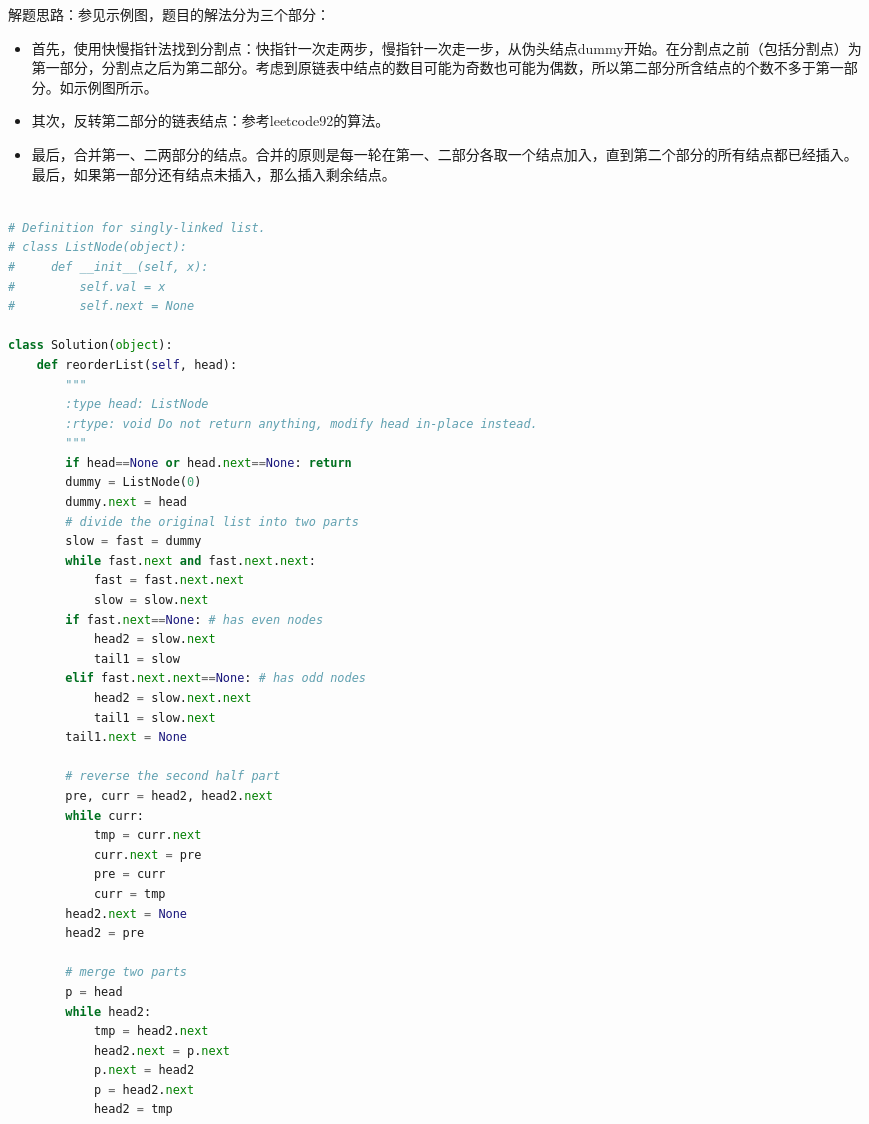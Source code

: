 \documentclass[a4paper,10pt]{article}
\begin{document}
\begin{CJK*}{UTF8}{gbsn}
\noindent 解题思路：参见示例图，题目的解法分为三个部分：
\begin{itemize}
    \item 首先，使用快慢指针法找到分割点：快指针一次走两步，慢指针一次走一步，从伪头结点dummy开始。在分割点之前（包括分割点）为第一部分，分割点之后为第二部分。考虑到原链表中结点的数目可能为奇数也可能为偶数，所以第二部分所含结点的个数不多于第一部分。如示例图所示。
    \item 其次，反转第二部分的链表结点：参考leetcode92的算法。
    \item 最后，合并第一、二两部分的结点。合并的原则是每一轮在第一、二部分各取一个结点加入，直到第二个部分的所有结点都已经插入。最后，如果第一部分还有结点未插入，那么插入剩余结点。
\end{itemize}
\end{CJK*}


\begin{lstlisting}[language=Python, caption=Problem143. Reorder List]

# Definition for singly-linked list.
# class ListNode(object):
#     def __init__(self, x):
#         self.val = x
#         self.next = None

class Solution(object):
    def reorderList(self, head):
        """
        :type head: ListNode
        :rtype: void Do not return anything, modify head in-place instead.
        """
        if head==None or head.next==None: return
        dummy = ListNode(0)
        dummy.next = head
        # divide the original list into two parts
        slow = fast = dummy
        while fast.next and fast.next.next:
            fast = fast.next.next
            slow = slow.next
        if fast.next==None: # has even nodes
            head2 = slow.next
            tail1 = slow
        elif fast.next.next==None: # has odd nodes
            head2 = slow.next.next
            tail1 = slow.next
        tail1.next = None
        
        # reverse the second half part
        pre, curr = head2, head2.next
        while curr:
            tmp = curr.next
            curr.next = pre
            pre = curr
            curr = tmp
        head2.next = None
        head2 = pre
        
        # merge two parts
        p = head
        while head2:
            tmp = head2.next
            head2.next = p.next
            p.next = head2
            p = head2.next
            head2 = tmp
\end{lstlisting}
\end{document}
